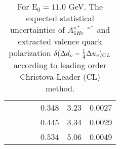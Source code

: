 \begin{table}[htbp]
\begin{center}
\begin{tabular}{|ccccc||c|c|}
         &          &          &          &    0.348 &      3.23 &    0.0027 \\
         &          &          &          &    0.445 &      3.34 &    0.0029 \\
         &          &          &          &    0.534 &      5.06 &    0.0049 \\
\hline
\end{tabular}
\end{center}
\caption{\label{tab:ddv1}  For E$_0=11.0 $ GeV. 
The expected statistical uncertainties of   $A_{1He}^{\pi^+ - \pi^-}$ and  extracted valence quark polarization $\delta ( \Delta d_v -{1 \over 4} \Delta u_v )_{CL}$
according to leading order Christova-Leader (CL) method. 
}
\end{table}
%
%
%
%
